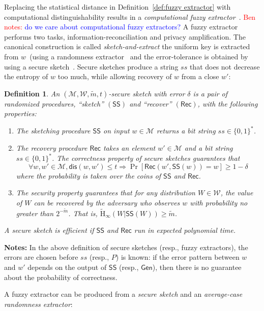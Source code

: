 \documentclass[11pt]{article}
\newcommand{\defref}[1]{\mbox{Definition~\ref{#1}}}
\newcommand{\class}[1]{{\ensuremath{\mathsf{#1}}}}
\newcommand{\gen}{\ensuremath{\class{Gen}}\xspace}
\newcommand{\sketch}{\ensuremath{\class{SS}}\xspace}
\newcommand{\rec}{\ensuremath{\class{Rec}}\xspace}
\newcommand{\dis}{\ensuremath{\mathsf{dis}}}
\newcommand{\Hav}{\tilde{\mathrm{H}}_\infty}
\newtheorem{definition}[theorem]{Definition}
\newcommand{\authnote}[2]{{\textcolor{red}{\textsf{#1 notes: }\textcolor{blue}{ #2}}\marginpar{\textcolor{red}{\textbf{!!!!!}}}}}
\newcommand{\authnote}[2]{}
\newcommand{\bnote}[1]{{\authnote{Ben}{#1}}}
\begin{document}
Replacing the statistical distance in \defref{def:fuzzy extractor} with computational distinguishability results in a \emph{computational fuzzy extractor}~\cite[Definition 2.5]{fuller2013computational}.  \bnote{do we care about computational fuzzy extractors?} A fuzzy extractor performs two tasks, information-reconciliation and privacy amplification.  The canonical construction is called \emph{sketch-and-extract} the uniform key is extracted from $w$~(using a randomness extractor~\cite{nisan1993randomness} and the error-tolerance is obtained by using a secure sketch~\cite[Lemma 4.1]{DBLP:journals/siamcomp/DodisORS08}.  Secure sketches produce a string $ss$ that does not decrease the entropy of $w$ too much, while allowing recovery of $w$ from a  close $w'$:
\begin{definition}
\label{def:secure sketch}
An $(\mathcal{M},\mathcal{W}, \tilde{m}, t)$-\emph{secure sketch} with error $\delta$ is a pair of randomized procedures, ``sketch'' $(\sketch)$ and ``recover'' $(\rec)$, with the following properties:
\begin{enumerate}
\item The sketching procedure \sketch on input $w\in\mathcal{M}$ returns a bit string $ss\in\{0,1\}^*$.
\item The recovery procedure \rec takes an element $w'\in\mathcal{M}$ and a bit string $ss\in\{0,1\}^*$.  The \emph{correctness} property of secure sketches guarantees that 
\[
 \forall w, w'\in\mathcal{M}, \dis(w,w')\leq t \Rightarrow \Pr[\rec(w',\sketch(w))=w]\geq 1-\delta
 \] 
where the probability is taken over the coins of $\sketch$ and $\rec$.  
\item The \emph{security} property guarantees that for any distribution $W\in\mathcal{W}$, the value of $W$ can be recovered by the adversary who observes $w$ with probability no greater than $2^{-\tilde{m}}$.  That is, $\Hav(W|\sketch(W))\geq \tilde{m}$.
\end{enumerate}
A secure sketch is \emph{efficient} if \sketch and \rec run in expected polynomial time. 
\end{definition}

\textbf{Notes:} In the above definition of secure sketches (resp., fuzzy extractors), the errors are chosen before $ss$ (resp., $P$) is known: if the error pattern between $w$ and $w'$ depends on the output of $\sketch$ (resp., $\gen$), then there is no guarantee about the probability of correctness.  

A fuzzy extractor can be produced from a \emph{secure sketch} and an \emph{average-case randomness extractor}:
\end{document}
